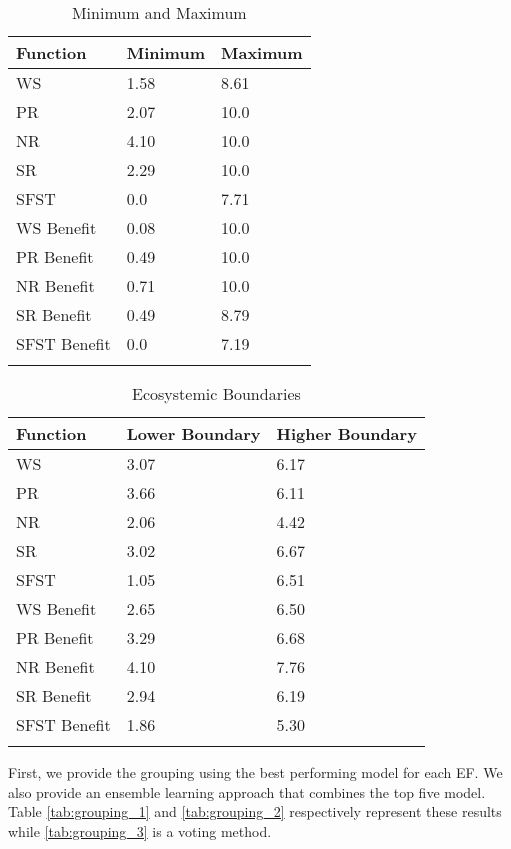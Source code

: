 \documentclass[12pt,letterpaper]{article}
\begin{document}
\begin{longtable}{|p{3cm}|p{4cm}|p{4cm}|}
\hline
\textbf{Function} & \textbf{Minimum} & \textbf{Maximum}  \\ \hline

WS & 1.58 & 8.61 \\ \hline
PR & 2.07 & 10.0\\ \hline
NR & 4.10 & 10.0 \\\hline
SR & 2.29 & 10.0 \\ \hline
SFST & 0.0 & 7.71 \\ \hline

WS Benefit & 0.08 & 10.0 \\ \hline
PR Benefit & 0.49 & 10.0\\ \hline
NR Benefit & 0.71 & 10.0 \\ \hline
SR Benefit & 0.49 & 8.79 \\ \hline
SFST Benefit & 0.0 & 7.19 \\ \hline
\caption{Minimum and Maximum}
\label{tab:norm}
\end{longtable}


\begin{longtable}{|p{3cm}|p{4cm}|p{4cm}|}
\hline
\textbf{Function} & \textbf{Lower Boundary} & \textbf{Higher Boundary}  \\ \hline

WS & 3.07 & 6.17\\ \hline
PR & 3.66 & 6.11 \\ \hline
NR &  2.06 & 4.42 \\\hline
SR & 3.02 & 6.67 \\ \hline
SFST & 1.05 &  6.51 \\ \hline

WS Benefit & 2.65 & 6.50\\ \hline
PR Benefit& 3.29 & 6.68\\ \hline
NR Benefit& 4.10& 7.76\\ \hline
SR Benefit & 2.94 & 6.19 \\ \hline
SFST Benefit &1.86 & 5.30 \\ \hline
\caption{Ecosystemic Boundaries}
\label{tab:boundaries}
\end{longtable}

First, we provide the grouping using the best performing model for each \ac{EF}.
We also provide an ensemble learning approach that combines the top five model.
Table \ref{tab:grouping_1} and \ref{tab:grouping_2} respectively represent these results while \ref{tab:grouping_3} is a voting method.
\end{document}
